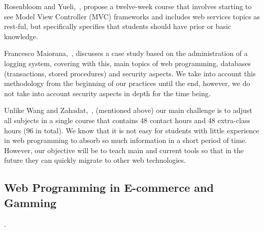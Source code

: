 Rosenbloom and Yueli,~\cite{10Rosenbloom2017}, propose a twelve-week course that 
involves starting to see Model View Controller (MVC) frameworks and includes web services topics 
as rest-ful, but specifically specifies that students should have prior or basic knowledge.

Francesco Maiorana,~\cite{Maiorana14}, discusses a case study based on the administration of a 
logging system, covering with this, main topics of web programming, databases (transactions, 
stored procedures) and security aspects. 
We take into account this methodology from the beginning of our practices until the end, however, 
we do not take into account security aspects in depth for the time being.

Unlike Wang and Zahadat,~\cite{9Wang2009}, (mentioned above) our main challenge is to adjust all 
subjects in a single course that contains 48 contact hours and 48 extra-class hours (96 in total). 
We know that it is not easy for students with little experience in web programming to absorb so much 
information in a short period of time. 
However, our objective will be to teach main and current tools so that in the future they can quickly 
migrate to other web technologies.

\subsection{Web Programming in E-commerce and Gamming}


 \cite{gerardo2017fundamentos}.


 \cite{michael2005serious}


